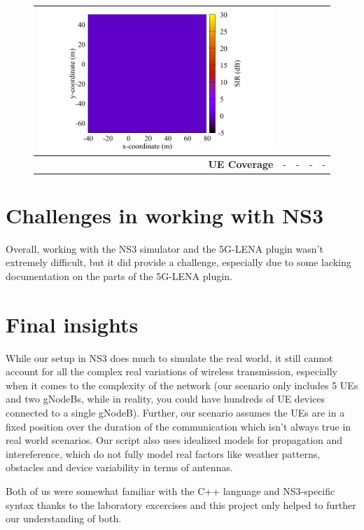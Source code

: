 \documentclass[10pt,a4]{article}
\begin{document}
\begin{figure}[ht!]
{\begin{tabular}{r|cccc}
    \includegraphics[width=0.25\linewidth]{../kpm-plots/nr-rem-UL_COVERAGE_AREA-sir.pdf} \\
    \hline
    \textbf{UE Coverage} &
    - &
    - &
    - &
    - \\
    \end{tabular}}
    \end{figure}
    \section{Challenges in working with NS3}
    Overall, working with the NS3 simulator and the 5G-LENA plugin wasn't extremely difficult, but it did provide a challenge, especially due to some lacking documentation on the parts of the 5G-LENA plugin.
    \section{Final insights}
    While our setup in NS3 does much to simulate the real world, it still cannot account for all the complex real variations of wireless transmission, especially when it comes to the complexity of the network (our scenario only includes 5 UEs and two gNodeBs, while in reality, you could have hundreds of UE devices connected to a single gNodeB). Further, our scenario assumes the UEs are in a fixed position over the duration of the communication which isn't always true in real world scenarios. Our script also uses idealized models for propagation and intereference, which do not fully model real factors like weather patterns, obstacles and device variability in terms of antennas.

    Both of us were somewhat familiar with the C++ language and NS3-specific syntax thanks to the laboratory excercises and this project only helped to further our understanding of both.
\end{document}

